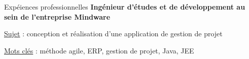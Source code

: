 \begin{rubric}{Expéiences professionnelles}
\entry*[]
	\textbf{Ingénieur d'études et de développement au sein de l’entreprise Mindware}
     \hfill{} 
    \par \underline{Sujet} : {conception et réalisation d'une application de gestion de projet}
    \hfill {}
    \par \underline{Mots clés} : méthode agile, ERP, gestion de projet, Java, JEE
      \hfill {}
%
%
%
\end{rubric}

